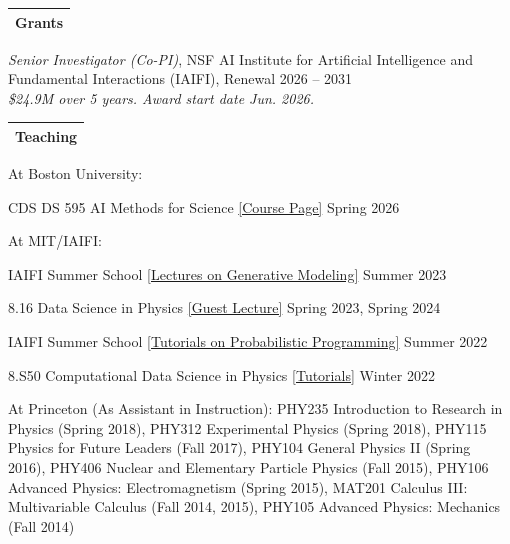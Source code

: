 \documentclass[letterpaper,11pt]{article}
\makeatletter
\newenvironment{packed_itemize}{
\begin{itemize}[label=\raisebox{0.25ex}{\tiny$\bullet$}, topsep=0pt, partopsep=0pt]
  \setlength{\itemsep}{4.0pt}
  \setlength{\parskip}{0pt}
  \setlength{\parsep}{0pt}}{\end{itemize}
}
\newcommand{\cvsection}[2]{%
  \needspace{4\baselineskip}%
  \par\vspace{3mm}%
  \noindent
  \begin{tabular*}{\textwidth}{l@{\extracolsep{\fill}}}
  \large {\sc \Large{#2}}\\
  \hline
  \end{tabular*}\vspace{3mm}%
}
\makeatother
\begin{document}

\cvsection{\faDollar}{Grants}

\begin{packed_itemize}
  \item \emph{Senior Investigator (Co-PI)}, NSF AI Institute for Artificial Intelligence and Fundamental Interactions (IAIFI), Renewal \hfill 2026 -- 2031 \\ \emph{\small \$24.9M over 5 years. Award start date Jun. 2026.}
\end{packed_itemize}


\cvsection{\faWpforms}{Teaching}

\noindent
At Boston University:
\begin{packed_itemize}
  \item CDS DS 595 AI Methods for Science \href{https://smsharma.io/teaching/ds595-ai4science.html}{[Course Page]} \hfill Spring 2026
\end{packed_itemize}

\vspace{2mm}

\noindent
At MIT/IAIFI:
\begin{packed_itemize}
  \item IAIFI Summer School \href{https://smsharma.io/iaifi-summer-school-2023/}{[Lectures on Generative Modeling]} \hfill Summer 2023
  \item 8.16 Data Science in Physics \href{https://github.com/smsharma/sbi-lecture-mit}{[Guest Lecture]} \hfill Spring 2023, Spring 2024
  \item IAIFI Summer School \href{https://github.com/smsharma/iaifi-summer-school-tutorials}{[Tutorials on Probabilistic Programming]} \hfill Summer 2022
  \item 8.S50 Computational Data Science in Physics \href{https://github.com/smsharma/prob-prog-8.S50-tutorial}{[Tutorials]} \hfill Winter 2022
\end{packed_itemize}

\vspace{2mm}

\noindent
At Princeton (As Assistant in Instruction):  {\scriptsize PHY235 Introduction to Research in Physics (Spring 2018), PHY312 Experimental Physics (Spring 2018), PHY115 Physics for Future Leaders (Fall 2017), PHY104 General Physics II (Spring 2016), PHY406 Nuclear and Elementary Particle Physics (Fall 2015), PHY106 Advanced Physics: Electromagnetism (Spring 2015), MAT201 Calculus III: Multivariable Calculus (Fall 2014, 2015), PHY105 Advanced Physics: Mechanics (Fall 2014)}
\end{document}
